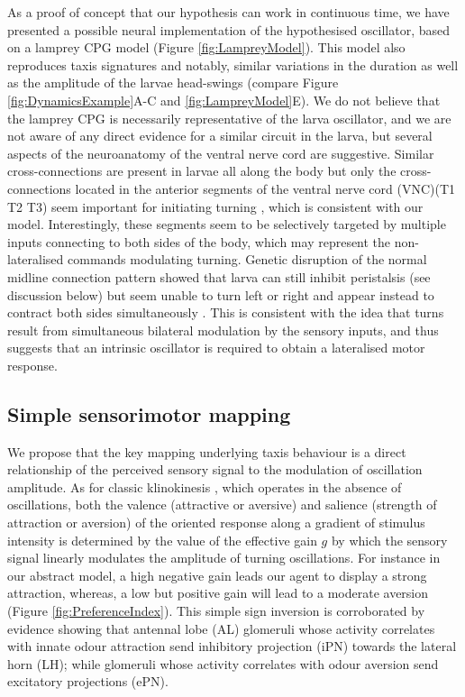 \documentclass[11pt,a4paper]{article}
\newcommand{\todoBW}[1]{\todo[author=BW,color=orange, size=\tiny,inline]{1}}
\begin{document}
As a proof of concept that our hypothesis can work in continuous time, we have presented a possible neural implementation of the hypothesised oscillator, based on a lamprey CPG model (Figure \ref{fig:LampreyModel}).
 This model also reproduces taxis signatures and notably, similar variations in the duration as well as the amplitude of the larvae head-swings (compare Figure \ref{fig:DynamicsExample}A-C and \ref{fig:LampreyModel}E).
  We do not believe that the lamprey CPG is necessarily representative of the larva oscillator, %
  and we are not aware of any direct evidence for a similar circuit in the larva, but several aspects of the neuroanatomy of the ventral nerve cord are suggestive. Similar cross-connections are present in larvae all along the body \citep{rickert2011morphological}
  but only the cross-connections located in the anterior segments of the ventral nerve cord (VNC)(T1 T2 T3) seem important for initiating turning \citep{ berni2015genetic}, which is consistent with our model. Interestingly, these segments seem to be selectively targeted by multiple inputs connecting to both sides of the body, which may represent the non-lateralised commands modulating turning. Genetic disruption of the normal midline connection pattern showed that larva can still inhibit peristalsis (see discussion below) but seem unable to turn left or right and appear instead to contract both sides simultaneously \citep{berni2015genetic}. This is consistent with the idea that turns result from simultaneous bilateral modulation by the sensory inputs, and thus suggests that an intrinsic oscillator is required to obtain a lateralised motor response.

\subsection{Simple sensorimotor mapping}
We propose that the key mapping underlying taxis behaviour is a direct relationship of the perceived sensory signal to the modulation of oscillation amplitude.
As for classic klinokinesis \citep{benhamou1989animals}, which operates in the absence of oscillations, both the valence (attractive or aversive) and salience (strength of attraction or aversion) of the oriented response along a gradient of stimulus intensity is determined by the value of the effective gain $g$ by which the sensory signal linearly modulates the amplitude of turning oscillations. For instance in our abstract model, a high negative gain leads our agent to display a strong attraction, whereas, a low but positive gain will lead to a moderate aversion (Figure \ref{fig:PreferenceIndex}). This simple sign inversion is corroborated by evidence showing that antennal lobe (AL) glomeruli whose activity correlates with innate odour attraction send inhibitory projection (iPN) towards the lateral horn (LH); while glomeruli whose activity correlates with odour aversion send excitatory projections (ePN). 
\end{document}
